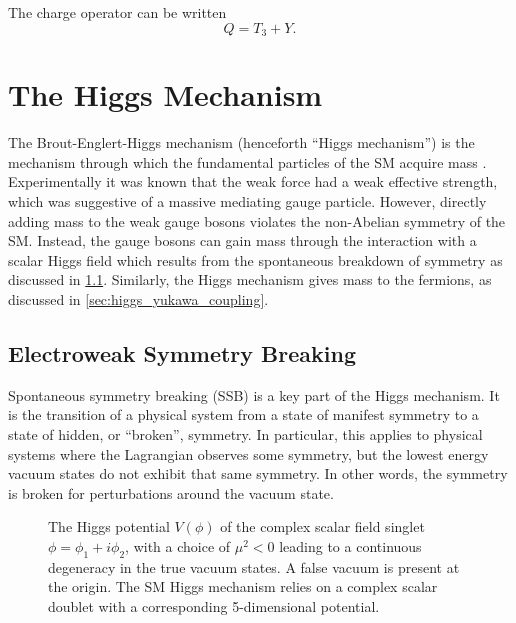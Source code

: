 The charge operator can be written 
%
\begin{equation}\label{eq:charge_operator}
  Q = T_3 + Y .
\end{equation}
%



\section{The Higgs Mechanism}\label{sec:sm_higgs}

The Brout-Englert-Higgs mechanism (henceforth ``Higgs mechanism'') is the mechanism through which the fundamental particles of the SM acquire mass \cite{Englert:1964et,Higgs:1964pj,Guralnik:1964eu}.
Experimentally it was known that the weak force had a weak effective strength, which was suggestive of a massive mediating gauge particle.
However, directly adding mass to the weak gauge bosons violates the non-Abelian symmetry of the SM.
Instead, the gauge bosons can gain mass through the interaction with a scalar Higgs field which results from the spontaneous breakdown of symmetry as discussed in \cref{sec:sm_ewsb}.
Similarly, the Higgs mechanism gives mass to the fermions, as discussed in \cref{sec:higgs_yukawa_coupling}.


\subsection{Electroweak Symmetry Breaking}\label{sec:sm_ewsb}

Spontaneous symmetry breaking (SSB) is a key part of the Higgs mechanism. It is the transition of a physical system from a state of manifest symmetry to a state of hidden, or ``broken'', symmetry. In particular, this applies to physical systems where the Lagrangian observes some symmetry, but the lowest energy vacuum states do not exhibit that same symmetry. In other words, the symmetry is broken for perturbations around the vacuum state.

%
\begin{figure}[!htbp]
  \centering
  
  \caption{
    The Higgs potential $V(\phi)$ of the complex scalar field singlet $\phi = \phi_1 + i \phi_2$, with a choice of $\mu^2 < 0$ leading to a continuous degeneracy in the true vacuum states. A false vacuum is present at the origin. The SM Higgs mechanism relies on a complex scalar doublet with a corresponding 5-dimensional potential.
  }
  \label{fig:higgs_potential}
\end{figure}
%

